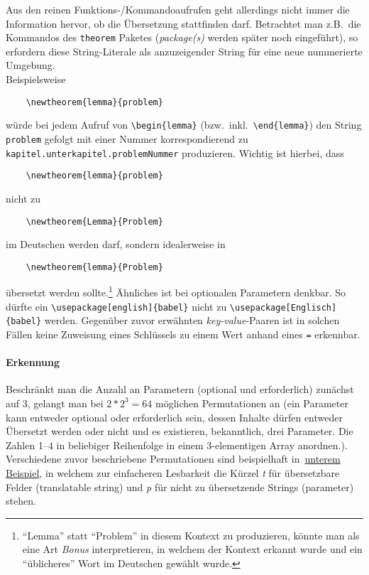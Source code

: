 Aus den reinen Funktions-/Kommandoaufrufen geht allerdings nicht immer die Information hervor, ob die Übersetzung stattfinden darf. Betrachtet man z.B.\ die Kommandos des \texttt{theorem} Paketes (\textit{package(s)} werden später noch eingeführt), so erfordern diese String-Literale als anzuzeigender String für eine neue nummerierte Umgebung.\\
Beispielsweise
\begin{Verbatim}
    \newtheorem{lemma}{problem}
\end{Verbatim}
würde bei jedem Aufruf von \verb"\begin{lemma}" (bzw.\ inkl.\ \verb|\end{lemma}|) den String \verb"problem" gefolgt mit einer Nummer korrespondierend zu \texttt{kapitel.unterkapitel.problemNummer} produzieren. Wichtig ist hierbei, dass 
\begin{Verbatim}
    \newtheorem{lemma}{problem}
\end{Verbatim}
nicht zu 
\begin{Verbatim}
    \newtheorem{Lemma}{Problem}
\end{Verbatim}
im Deutschen werden darf, sondern idealerweise in 
\begin{Verbatim}
    \newtheorem{lemma}{Problem}
\end{Verbatim}
übersetzt werden sollte.\footnote{\enquote{Lemma} statt \enquote{Problem} in diesem Kontext zu produzieren, könnte man als eine Art \textit{Bonus} interpretieren, in welchem der Kontext erkannt wurde und ein \enquote{üblicheres} Wort im Deutschen gewählt wurde.}%
Ähnliches ist bei optionalen Parametern denkbar. So dürfte ein \verb"\usepackage[english]{babel}" nicht zu \verb"\usepackage[Englisch]{babel}" werden. Gegenüber zuvor erwähnten \textit{key-value}-Paaren ist in solchen Fällen keine Zuweisung eines Schlüssels zu einem Wert anhand eines \verb-=- erkennbar.


\paragraph{Erkennung}
Beschränkt man die Anzahl an Parametern (optional und erforderlich) zunächst auf 3, gelangt man bei ${2*2}^{3}=64$ möglichen Permutationen an (ein Parameter kann entweder optional oder erforderlich sein, dessen Inhalte dürfen entweder Übersetzt werden oder nicht und es existieren, bekanntlich, drei Parameter. Die Zahlen 1--4 in beliebiger Reihenfolge in einem 3-elementigen Array anordnen.). 
Verschiedene zuvor beschriebene Permutationen sind beispielhaft in~\hyperref[tab:problems:exampleParameter]{unterem Beispiel}, in welchem zur einfacheren Lesbarkeit die Kürzel \textit{t} für übersetzbare Felder (translatable string) und \textit{p} für nicht zu übersetzende Strings (parameter) stehen.

